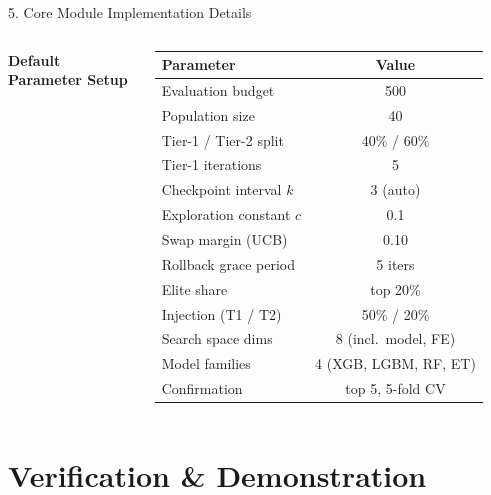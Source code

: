 \documentclass[aspectratio=169, 11pt]{beamer}
\begin{document}
\begin{frame}{5. Core Module Implementation Details}
\begin{columns}[T]
        \centering
        {\scriptsize \textbf{\textcolor{amritaMaroon}{Default Parameter Setup}}}
        \vspace{0.05cm}
        \begin{table}
            \centering
            \tiny
            \renewcommand{\arraystretch}{1.0}
            \begin{tabular}{lc}
                \toprule
                \textbf{Parameter} & \textbf{Value} \\
                \midrule
                Evaluation budget & 500 \\
                Population size & 40 \\
                Tier-1 / Tier-2 split & 40\% / 60\% \\
                Tier-1 iterations & 5 \\
                Checkpoint interval $k$ & 3 (auto) \\
                Exploration constant $c$ & 0.1 \\
                Swap margin (UCB) & 0.10 \\
                Rollback grace period & 5 iters \\
                Elite share & top 20\% \\
                Injection (T1 / T2) & 50\% / 20\% \\
                Search space dims & 8 (incl.\ model, FE) \\
                Model families & 4 (XGB, LGBM, RF, ET) \\
                Confirmation & top 5, 5-fold CV \\
                \bottomrule
            \end{tabular}
        \end{table}
    \end{columns}
\end{frame}

\section{Verification \& Demonstration}
\end{document}
